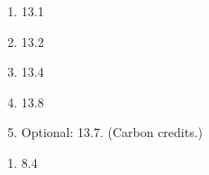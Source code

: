 \documentclass[12pt]{article}
\begin{document}

\begin{enumerate}
\setlength{\itemsep}{-1mm}
\item 13.1
\item 13.2
\item 13.4
\item 13.8
\item Optional: 13.7.  (Carbon credits.)
\end{enumerate}

\begin{enumerate}
\setlength{\itemsep}{-1mm}
\item 8.4
\end{enumerate}
\end{document}
